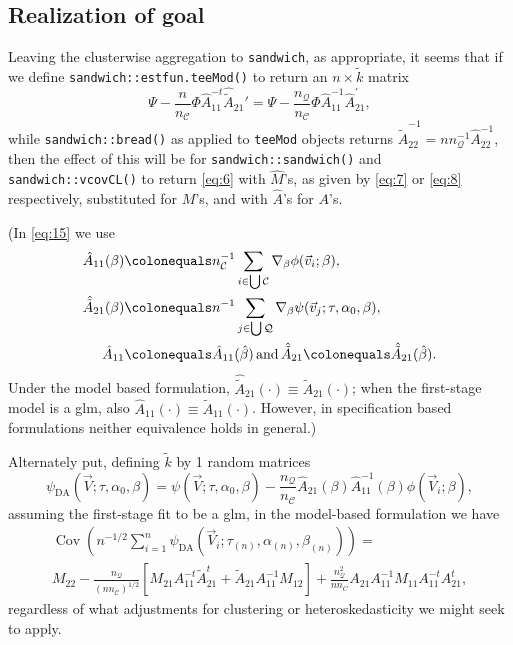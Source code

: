 \documentclass{article}
\newcommand{\defeq}{\ensuremath{\colonequals}}
\begin{document}
\subsection{Realization of goal} \label{sec:realization-goal}
Leaving the clusterwise aggregation to \texttt{sandwich}, as
appropriate, it seems that if we define
\texttt{sandwich::estfun.teeMod()} to return an $n \times \tilde{k}$ matrix
\begin{equation} \label{eq:15}
  \Psi -
  \frac{n}{n_{\mathcal{C}}}\Phi
  \hat{A}_{11}^{-t}\hat{\tilde{A}}_{21}' = \Psi -
 \frac{n_{\mathcal{Q}}}{n_{\mathcal{C}}}\Phi
 \hat{A}_{11}^{-1}\hat{A}_{21}^{\prime},
\end{equation}
while \texttt{sandwich::bread()} as applied to
\texttt{teeMod} objects returns $\hat{\tilde{A}}_{22}^{-1} = nn_{\mathcal{Q}}^{-1}\hat{A}_{22}^{-1}$, then the effect of this will be for \texttt{sandwich::sandwich()}
and \texttt{sandwich::vcovCL()} to return \eqref{eq:6} with
$\hat{M}$'s,  as
given by \eqref{eq:7} or \eqref{eq:8} respectively, substituted for
$M$'s, and with $\hat{A}$'s for $A$'s.

(In \eqref{eq:15}
we use
\begin{align*}
  \hat{A}_{11}(\beta) &\defeq  n_{\mathcal{C}}^{-1}\sum_{i\in \bigcup
        \mathcal{C}}\nabla_{\beta}\phi(\vec{v}_{i};
        \beta ),\\
  \hat{\tilde{A}}_{21}(\beta) &\defeq n^{-1}\sum_{j\in \bigcup
        \mathcal{Q}}\nabla_{\beta}\psi(\vec{v}_{j};
        \tau, \alpha_{0}, \beta ),\\
  \hat{A}_{11}&\defeq \hat{A}_{11}(\hat\beta)\, \text{and}\, \hat{\tilde{A}}_{21}\defeq \hat{\tilde{A}}_{21}(\hat\beta).
\end{align*}
Under the model based
formulation, $\hat{\tilde{A}}_{21}(\cdot) \equiv \tilde{A}_{21}(\cdot)$; when the
first-stage model is a glm, also $\hat{A}_{11}(\cdot) \equiv
\tilde{A}_{11}(\cdot)$.  However, in specification based formulations neither
equivalence holds in general.)

Alternately put,
defining $\tilde{k}$ by 1 random matrices
\begin{equation}\label{eq:10}
    \psi_\text{DA}(\vec{V}; \tau, \alpha_{0},
    \beta) = \psi (\vec{V}; \tau,\alpha_{0},
    \beta) -
    \frac{n_{\mathcal{Q}}}{n_{\mathcal{C}}}
    \hat{{A}}_{21}(\beta) \hat{A}_{11}^{-1}(\beta)\phi(\vec{V}_{i};
    \beta),
\end{equation}
assuming the first-stage fit to be a glm, in the model-based formulation we have
\begin{multline}
  \operatorname{Cov}\left(n^{-1/2}\sum_{i=1}^{n} \psi_\text{DA}(\vec{V}_{i}; \tau_{(n)},\alpha_{(n)},
    \beta_{(n)})\right) = \\
  M_{22} -
                                 \frac{n_{\mathcal{Q}}}{(n n_{\mathcal{C}})^{1/2}}[M_{21}A_{11}^{-t}\tilde{A}_{21}^t
                                 + \tilde{A}_{21}A_{11}^{-1}M_{12}] +
                                 \frac{n_{\mathcal{Q}}^{2}}{nn_C}{A}_{21}A_{11}^{-1}M_{11}A_{11}^{-t}{A}_{21}^{t}, \label{eq:12}
                               \end{multline}
regardless of what adjustments for
clustering or heteroskedasticity we might seek to apply.
\end{document}
